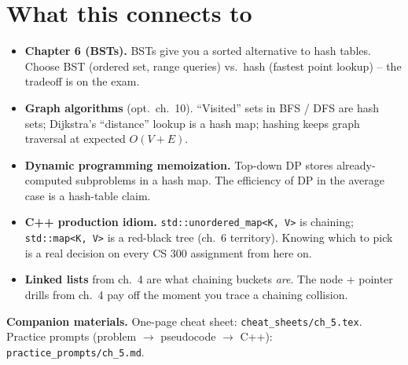 \documentclass[11pt]{article}
\begin{document}
\section*{What this connects to}

\begin{notebox}
\begin{itemize}
    \item \textbf{Chapter 6 (BSTs).} BSTs give you a sorted alternative
    to hash tables. Choose BST (ordered set, range queries) vs.\ hash
    (fastest point lookup) -- the tradeoff is on the exam.
    \item \textbf{Graph algorithms} (opt.\ ch.~10). ``Visited'' sets in
    BFS / DFS are hash sets; Dijkstra's ``distance'' lookup is a hash
    map; hashing keeps graph traversal at expected $O(V + E)$.
    \item \textbf{Dynamic programming memoization.} Top-down DP stores
    already-computed subproblems in a hash map. The efficiency of DP
    in the average case is a hash-table claim.
    \item \textbf{C++ production idiom.}
    \texttt{std::unordered\_map<K, V>} is chaining; \texttt{std::map<K,
    V>} is a red-black tree (ch.~6 territory). Knowing which to pick
    is a real decision on every CS 300 assignment from here on.
    \item \textbf{Linked lists} from ch.~4 are what chaining buckets
    \emph{are}. The node + pointer drills from ch.~4 pay off the moment
    you trace a chaining collision.
\end{itemize}
\end{notebox}

\textbf{Companion materials.} One-page cheat sheet:
\texttt{cheat\_sheets/ch\_5.tex}. Practice prompts (problem $\to$
pseudocode $\to$ C++): \texttt{practice\_prompts/ch\_5.md}.
\end{document}
